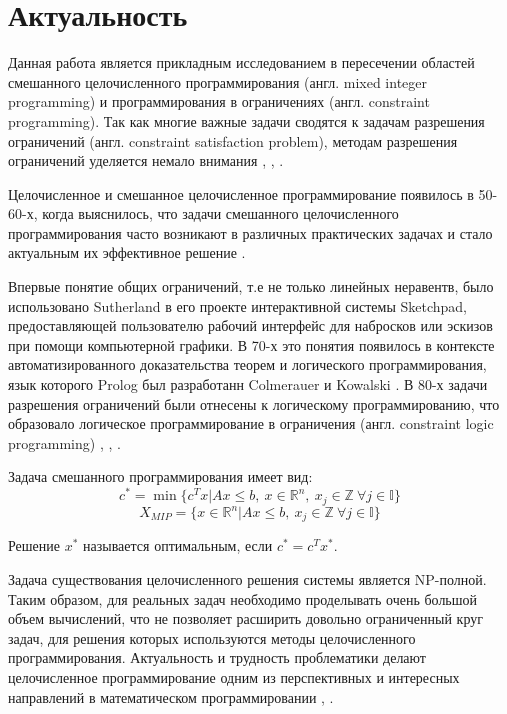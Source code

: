 \documentclass[a4paper,14pt,russian]{extreport}
\begin{document}
\section{Актуальность}

Данная работа является прикладным исследованием в пересечении областей смешанного целочисленного программирования (англ. mixed integer programming) и программирования в ограничениях (англ. constraint programming). Так как многие важные задачи сводятся к задачам разрешения ограничений (англ. constraint satisfaction problem), методам разрешения ограничений уделяется немало внимания \cite{dechter}, \cite{freuder}, \cite{tsang}. 
\par Целочисленное и смешанное целочисленное программирование появилось в 50-60-х, когда выяснилось, что задачи смешанного целочисленного программирования часто возникают в различных практических задачах и стало актуальным их эффективное решение \cite{markowitz_manne}.
\par Впервые понятие общих ограничений, т.е не только линейных неравентв, было использовано Sutherland \cite{sutherland} в его проекте интерактивной системы Sketchpad, предоставляющей пользователю рабочий интерфейс для набросков или эскизов при помощи компьютерной графики. В 70-х это понятия появилось в контексте автоматизированного доказательства теорем и логического программирования, язык которого Prolog был разработанн Colmerauer \cite{colmerauer} и Kowalski \cite{kowalski}. В 80-х задачи разрешения ограничений были отнесены к логическому программированию, что образовало логическое программирование в ограничения (англ. constraint logic programming) \cite{jaffar_lassez}, \cite{dincbas}, \cite{colmerauer_2}.
\par Задача смешанного программирования имеет вид:
  $$c^* = \min\{c^Tx|Ax\le b,~ x\in \mathbb{R}^n,~ x_j\in\mathbb{Z}~ \forall j\in\mathbb{I}\}$$
  $$X_{MIP}=\{x\in\mathbb{R}^n|Ax\le b,~ x_j\in\mathbb{Z}~ \forall j\in\mathbb{I}\}$$
\par Решение $x^*$ называется оптимальным, если $c^* = c^Tx^*$.
\par Задача существования целочисленного решения системы является NP-полной. Таким образом, для реальных задач необходимо проделывать очень большой объем вычислений, что не позволяет расширить довольно ограниченный круг задач, для решения которых используются методы целочисленного программирования. Актуальность и трудность проблематики делают целочисленное программирование одним из перспективных и интересных направлений в математическом программировании \cite{karmanov}, \cite {balinski}.
\end{document}
